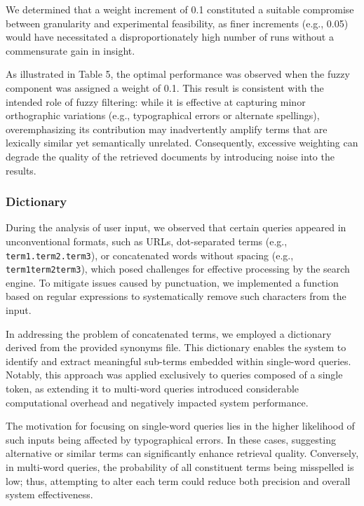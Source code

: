 \vspace{\baselineskip}

We determined that a weight increment of 0.1 constituted a suitable compromise between granularity and experimental feasibility, as finer increments (e.g., 0.05) would have necessitated a disproportionately high number of runs without a commensurate gain in insight.

\vspace{\baselineskip}

As illustrated in Table 5, the optimal performance was observed when the fuzzy component was assigned a weight of 0.1. This result is consistent with the intended role of fuzzy filtering: while it is effective at capturing minor orthographic variations (e.g., typographical errors or alternate spellings), overemphasizing its contribution may inadvertently amplify terms that are lexically similar yet semantically unrelated. Consequently, excessive weighting can degrade the quality of the retrieved documents by introducing noise into the results.

\subsubsection{Dictionary}
\label{subsubsec:Dictionary}
During the analysis of user input, we observed that certain queries appeared in unconventional formats, such as URLs, dot-separated terms (e.g., \texttt{term1.term2.term3}), or concatenated words without spacing (e.g., \texttt{term1term2term3}), which posed challenges for effective processing by the search engine. To mitigate issues caused by punctuation, we implemented a function based on regular expressions to systematically remove such characters from the input.

In addressing the problem of concatenated terms, we employed a dictionary derived from the provided synonyms file. This dictionary enables the system to identify and extract meaningful sub-terms embedded within single-word queries. Notably, this approach was applied exclusively to queries composed of a single token, as extending it to multi-word queries introduced considerable computational overhead and negatively impacted system performance.

The motivation for focusing on single-word queries lies in the higher likelihood of such inputs being affected by typographical errors. In these cases, suggesting alternative or similar terms can significantly enhance retrieval quality. Conversely, in multi-word queries, the probability of all constituent terms being misspelled is low; thus, attempting to alter each term could reduce both precision and overall system effectiveness.

